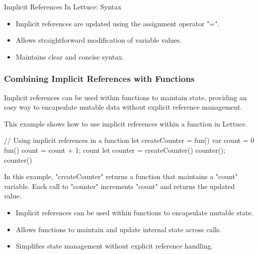\begin{notes}{Implicit References In Lettuce: Syntax}
\begin{highlight}
        \begin{itemize}
            \item Implicit references are updated using the assignment operator "=".
            \item Allows straightforward modification of variable values.
            \item Maintains clear and concise syntax.
        \end{itemize}
    
    \end{highlight}
    
    \subsubsection*{Combining Implicit References with Functions}
    
    Implicit references can be used within functions to maintain state, providing an easy way to encapsulate mutable data without explicit reference management.
    
    \begin{highlight}
    
        This example shows how to use implicit references within a function in Lettuce.
    
    \begin{code}[Lettuce]
    // Using implicit references in a function
    let createCounter = fun() {
        var count = 0
        fun() {
            count = count + 1;
            count
        }
    }
    let counter = createCounter()
    counter(); counter()
    \end{code}
    
        In this example, "createCounter" returns a function that maintains a "count" variable. Each call to "counter" increments "count" and returns the updated value.
    
        \begin{itemize}
            \item Implicit references can be used within functions to encapsulate mutable state.
            \item Allows functions to maintain and update internal state across calls.
            \item Simplifies state management without explicit reference handling.
        \end{itemize}
    
    \end{highlight}
    

\end{notes}
